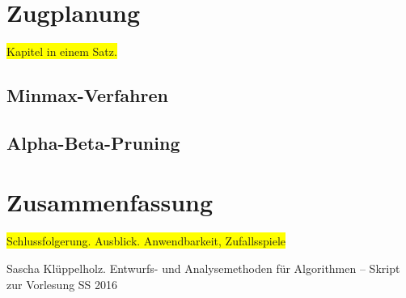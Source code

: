 \documentclass[a4paper,twoside]{scrartcl}
\newcommand\todo[1]{\colorbox{yellow}{#1}}
\begin{document}
\section{Zugplanung}
\todo{Kapitel in einem Satz.}

\subsection{Minmax-Verfahren}



\subsection{Alpha-Beta-Pruning}

\section{Zusammenfassung}
\todo{Schlussfolgerung. Ausblick. Anwendbarkeit, Zufallsspiele}

\begin{thebibliography}{99}

 Sascha Klüppelholz.
\newblock Entwurfs- und Analysemethoden für Algorithmen -- Skript zur Vorlesung SS 2016
 
\end{thebibliography}
\end{document}
